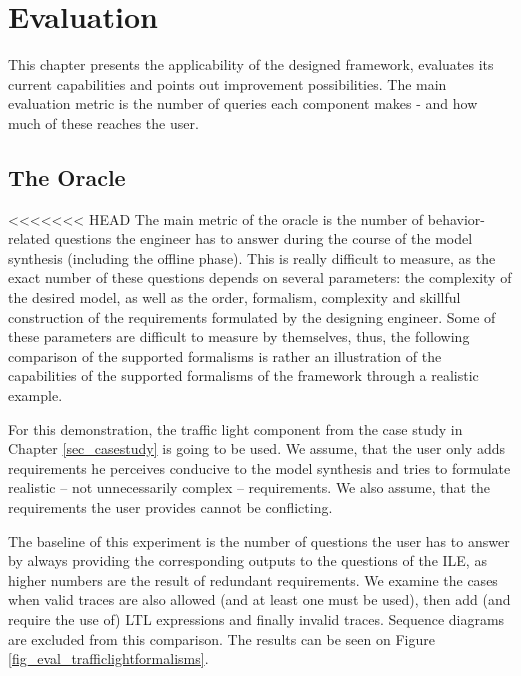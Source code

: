 \chapter{Evaluation}
This chapter presents the applicability of the designed framework, evaluates its current capabilities and points out improvement possibilities. The main evaluation metric is the number of queries each component makes - and how much of these reaches the user.

\section{The Oracle} \label{subs_evaloracle}
<<<<<<< HEAD
The main metric of the oracle is the number of behavior-related questions the engineer has to answer during the course of the model synthesis (including the offline phase). This is really difficult to measure, as the exact number of these questions depends on several parameters: the complexity of the desired model, as well as the order, formalism, complexity and skillful construction of the requirements formulated by the designing engineer. Some of these parameters are difficult to measure by themselves, thus, the following comparison of the supported formalisms is rather an illustration of the capabilities of the supported formalisms of the framework through a realistic example. 

For this demonstration, the traffic light component from the case study in Chapter \ref{sec_casestudy} is going to be used. We assume, that the user only adds requirements he perceives conducive to the model synthesis and tries to formulate realistic -- not unnecessarily complex -- requirements. We also assume, that the requirements the user provides cannot be conflicting.

The baseline of this experiment is the number of questions the user has to answer by always providing the corresponding outputs to the questions of the ILE, as higher numbers are the result of redundant requirements. We examine the cases when valid traces are also allowed (and at least one must be used), then add (and require the use of) LTL expressions and finally invalid traces. Sequence diagrams are excluded from this comparison. The results can be seen on Figure \ref{fig_eval_trafficlightformalisms}.

